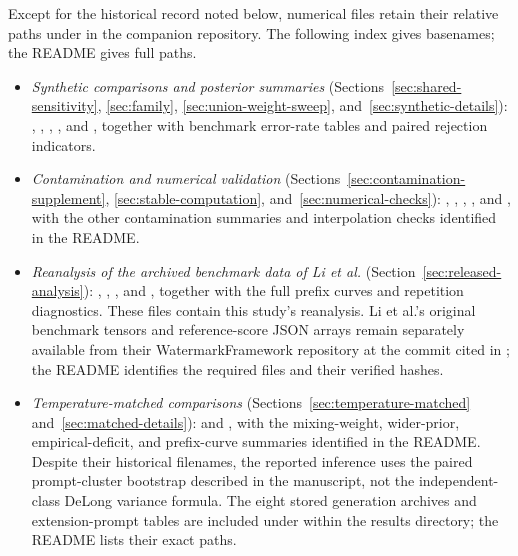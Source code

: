 \documentclass[11pt]{article}
\begin{document}
Except for the historical record noted below, numerical files retain their
relative paths under  in the companion
repository.  The following index gives basenames; the README gives full paths.
\begin{itemize}
  \item \emph{Synthetic comparisons and posterior summaries}
  (Sections~\ref{sec:shared-sensitivity}, \ref{sec:family},
  \ref{sec:union-weight-sweep}, and~\ref{sec:synthetic-details}):
  , ,
  , , and
  , together with benchmark error-rate tables
  and paired rejection indicators.

  \item \emph{Contamination and numerical validation}
  (Sections~\ref{sec:contamination-supplement}, \ref{sec:stable-computation},
  and~\ref{sec:numerical-checks}): ,
  , ,
  , and
  , with the other
  contamination summaries and interpolation checks identified in the README.

  \item \emph{Reanalysis of the archived benchmark data of Li et al.}
  (Section~\ref{sec:released-analysis}): ,
  , , and
  , together with the full prefix curves and
  repetition diagnostics.  These files contain this study's reanalysis.
  Li et al.'s original benchmark tensors and reference-score JSON arrays
  remain separately available from their WatermarkFramework repository at
  the commit cited in \citet{li2024watermarkframework}; the README identifies
  the required files and their verified hashes.

  \item \emph{Temperature-matched comparisons}
  (Sections~\ref{sec:temperature-matched} and~\ref{sec:matched-details}):
   and ,
  with the mixing-weight, wider-prior, empirical-deficit, and prefix-curve
  summaries identified in the README.  Despite their historical filenames,
  the reported inference uses the paired prompt-cluster bootstrap described
  in the manuscript, not the independent-class DeLong variance formula.
  The eight stored generation archives and extension-prompt tables are
  included under  within the results
  directory; the README lists their exact paths.


\end{itemize}
\end{document}
